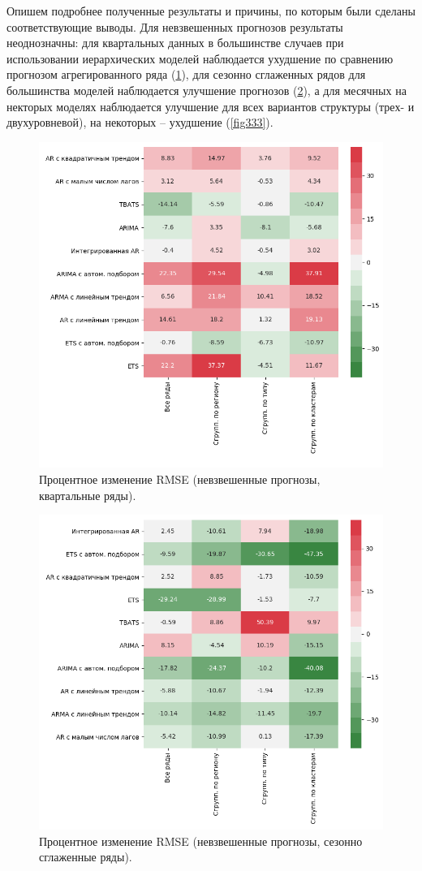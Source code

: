 \documentclass[12pt,a4paper, oneside]{extreport}
\begin{document}

Опишем подробнее полученные результаты и причины, по которым были сделаны соответствующие выводы.
Для невзвешенных прогнозов результаты неоднозначны: для квартальных данных в большинстве случаев при использовании иерархических моделей наблюдается ухудшение  по сравнению прогнозом агрегированного ряда (\ref{fig111}), для сезонно сглаженных рядов для большинства моделей наблюдается улучшение прогнозов (\ref{fig222}), а для месячных на некторых моделях наблюдается улучшение для всех вариантов структуры (трех- и двухуровневой),   на некоторых -- ухудшение (\ref{fig333}).
 
 
\begin{figure}
	\centering
	\includegraphics[width=0.7\linewidth]{screenshot020}
	\caption{Процентное изменение RMSE (невзвешенные прогнозы, квартальные ряды).
	}
	\label{fig111}
\end{figure}
 
\begin{figure}
	\centering
	\includegraphics[width=0.7\linewidth]{screenshot021}
	\caption{Процентное изменение RMSE (невзвешенные прогнозы, сезонно сглаженные  ряды).
	}
	\label{fig222}
\end{figure}
\end{document}
